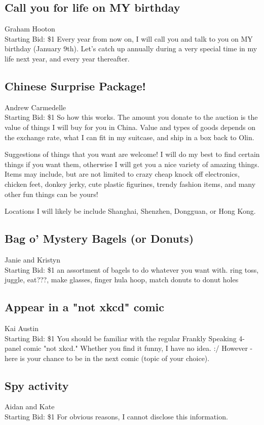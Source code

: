 \documentclass[11pt]{article}
\begin{document}
\subsection{Call you for life on MY birthday}
Graham Hooton
\\
Starting Bid: \$1
\newline
Every year from now on, I will call you and talk to you on MY birthday (January 9th). Let's catch up annually during a very special time in my life next year, and every year thereafter.
\subsection{Chinese Surprise Package!}
Andrew Carmedelle
\\
Starting Bid: \$1
\newline
So how this works. The amount you donate to the auction is the value of things I will buy for you in China. Value and types of goods depends on the exchange rate, what I can fit in my suitcase, and ship in a box back to Olin.

Suggestions of things that you want are welcome! I will do my best to find certain things if you want them, otherwise I will get you a nice variety of amazing things. Items may include, but are not limited to crazy cheap knock off electronics, chicken feet, donkey jerky, cute plastic figurines, trendy fashion items, and many other fun things can be yours!

Locations I will likely be include Shanghai, Shenzhen, Dongguan, or Hong Kong.
\subsection{Bag o' Mystery Bagels (or Donuts)}
Janie and Kristyn
\\
Starting Bid: \$1
\newline
an assortment of bagels to do whatever you want with.  ring toss, juggle, eat???, make glasses, finger hula hoop, match donuts to donut holes
\subsection{Appear in a "not xkcd" comic}
Kai Austin
\\
Starting Bid: \$1
\newline
You should be familiar with the regular Frankly Speaking 4-panel comic "not xkcd." Whether you find it funny, I have no idea. :/ However - here is your chance to be in the next comic (topic of your choice).
\subsection{Spy activity}
Aidan and Kate
\\
Starting Bid: \$1
\newline
For obvious reasons, I cannot disclose this information.
\end{document}
